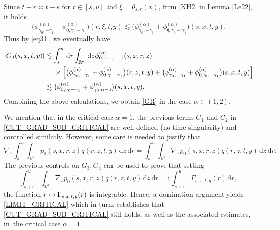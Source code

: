 \documentclass[11pt]{article}
\numberwithin{equation}{section}\providecommand{\asymp}{\mathrel{\sim}}
\def\mto{\mathchoice{\longmapsto}{\mapsto}{\mapsto}{\mapsto}}
\theoremstyle{plain}
\theoremstyle{definition}
\let\eps\varepsilon
\newcommand\mR{\mathbb{R}}
\newcommand\1{{\mathbf{1}}}
\newcommand{\dif}{\,\mathrm{d}}
\begin{document}
Since $t-r \asymp t-s$ for $r\in[s,u]$ and $\xi=\theta_{s,r}(x)$, from \eqref{KH2} in Lemma \ref{Le22}, it holds
\[
\bigl(\phi^{(\alpha)}_{\gamma_0,-\gamma_1}+\phi^{(\alpha)}_{0,\gamma_0-\gamma_1}\bigr)(r,\xi,t,y)\lesssim \bigl(\phi^{(\alpha)}_{\gamma_0,-\gamma_1}+\phi^{(\alpha)}_{0,\gamma_0-\gamma_1}\bigr)(s,x,t,y).
\]
Thus by \eqref{eq31}, we eventually have
\begin{align*}
|G_4(s,x,t,y)|
&\lesssim \int_s^u\dif r \int_{\mR^d} \dif z \phi_{0,\alpha+\gamma_1-1}^{(\alpha)}(s,x,r,z)\\
&\hspace*{.5cm}\times\Big[ \bigl(\phi^{(\alpha)}_{\gamma_0,-\gamma_1}+\phi^{(\alpha)}_{0,\gamma_0-\gamma_1}\bigr)(r,z,t,y)+ \bigl(\phi^{(\alpha)}_{\gamma_0,-\gamma_1}+\phi^{(\alpha)}_{0,\gamma_0-\gamma_1}\bigr)(s,x,t,y) \Big]\\
&\lesssim \bigl(\phi^{(\alpha)}_{0,\gamma_0-\gamma_1}+\phi^{(\alpha)}_{\gamma_0,\alpha-1}\bigr)(s,x,t,y).
\end{align*}
Combining the above calculations, we obtain \eqref{GR} in the case $\alpha\in (1,2) $.

{We mention that in the critical case $\alpha=1 $, the previous terms $G_1$ and $G_2$ in \eqref{CUT_GRAD_SUB_CRITICAL} are well-defined (no time singularity) and controlled similarly. However, some care is needed to justify that
\begin{equation}\label{LIMIT_CRITICAL}
\nabla_x \int_s^u\!\!\int_{\mR^d}\!\! {p}_0(s,x,r,z)q(r,z,t,y)\dif z \dif r =\int_s^u\!\!\int_{\mR^d}\!\!\nabla_x {p}_0(s,x,r,z)q(r,z,t,y)\dif z \dif r.
\end{equation}
The previous controls on $G_3,G_4$ can be used to prove that setting
\[
\int_{s+\varepsilon}^u\int_{\mR^d}\nabla_x {p}_0(s,x,r,z)q(r,z,t,y)\dif z \dif r=:\int_{s+\eps}^u
\Gamma_{s,x,t,y}(r)\dif r,
\] the function $r\mto \Gamma_{s,x,t,y}(r) $ is integrable.
Hence, a domination argument yields \eqref{LIMIT_CRITICAL} which in turns establishes that \eqref{CUT_GRAD_SUB_CRITICAL} still holds, as well as the associated estimates, in~the critical case $\alpha=1 $}.
\end{document}
